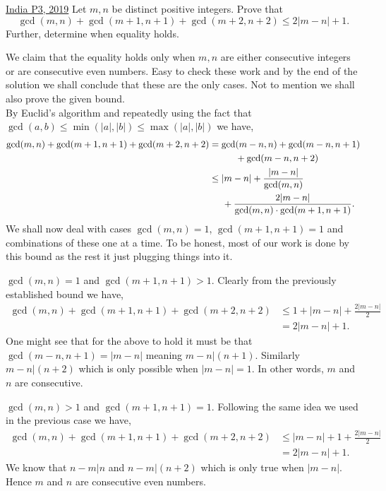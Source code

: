 \begin{problem}{2}{\href{https://artofproblemsolving.com/community/c6h1770752p34739465}{India P3, 2019}} 
	Let $m,n$ be distinct positive integers. Prove that
	$$\gcd(m,n) + \gcd(m+1,n+1) + \gcd(m+2,n+2) \le 2|m-n| + 1. $$Further, determine when equality holds.
	\begin{solution} We claim that the equality holds only when $m,n$ are either consecutive integers or are consecutive even numbers. Easy to check these work and by the end of the solution we shall conclude that these are the only cases. Not to mention we shall also prove the given bound.\\
	By Euclid's algorithm and repeatedly using the fact that $\gcd(a,b)\le \min(|a|, |b|)\le \max(|a|, |b|)$ we have,
	\begin{align*}
		\gcd(m,n) + \gcd(m+1,n+1) + \gcd(m+2,n+2) & = \gcd(m-n,n)+\gcd(m-n,n+1)\\
		&\hspace{1cm}+ \gcd(m-n,n+2)\\
		&\le  |m-n|+ \frac{|m-n|}{\gcd(m,n)}\\
		&\hspace{0.5cm}+\frac{2|m-n|}{\gcd(m,n)\cdot\gcd(m+1, n+1)}.
	\end{align*}
	\indent We shall now deal with cases $\gcd(m,n)=1$, $\gcd(m+1,n+1)=1$ and combinations of these one at a time. To be honest, most of our work is done by this bound as the rest it just plugging things into it.\\

	\begin{mycases}
		\item $\gcd(m,n)=1$ and $\gcd(m+1, n+1)>1$. Clearly from the previously established bound we have,
		\begin{align*}
			\gcd(m,n) + \gcd(m+1,n+1) + \gcd(m+2,n+2) &\le 1+|m-n|+\frac{2|m-n|}{2}\\
			&= 2|m-n|+1.
		\end{align*}
		One might see that for the above to hold it must be that $\gcd(m-n, n+1)=|m-n|$ meaning $m-n\lvert (n+1)$. Similarly $m-n\lvert (n+2)$ which is only possible when $|m-n|=1$. In other words, $m$ and $n$ are consecutive.

		\item $\gcd(m, n)>1$ and $\gcd(m+1, n+1)=1$. Following the same idea we used in the previous case we have,
		\begin{align*}
			\gcd(m,n) + \gcd(m+1,n+1) + \gcd(m+2,n+2) &\le |m-n|+1+\frac{2|m-n|}{2}\\
			&= 2|m-n|+1.
		\end{align*}
		We know that $n-m\lvert n$ and $n-m\lvert (n+2)$ which is only true when $|m-n|$. Hence $m$ and $n$ are consecutive even numbers.\\


\end{mycases}
\end{solution}
\end{problem}

